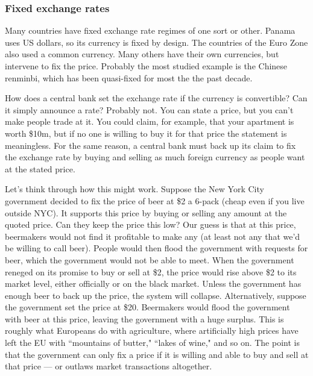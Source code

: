 \documentclass[letterpaper,12pt]{article}
\begin{document}
\subsubsection*{Fixed exchange rates}

Many countries have fixed exchange rate regimes of one sort or other.
Panama uses US dollars, so its currency is fixed by design.
The countries of the Euro Zone also used a common currency.
Many others have their own currencies, but intervene to
fix the price.
Probably the most studied example is the Chinese renminbi,
which has been quasi-fixed for most the the past decade.


How does a central bank set the exchange rate if the currency
 is convertible?
Can it simply announce a rate?
Probably not.
You can state a price, but you can't make people trade at it.
You could claim, for example, that your apartment is worth
\$10m, but if no one is willing to buy it for that price
the statement is meaningless.
For the same reason, a central bank must back up its
claim to fix the exchange rate by buying and selling as much
foreign currency as people want at the stated price.


Let's think through how this might work.
Suppose the New York City government decided to fix the price of beer at \$2 a 6-pack (cheap even if you live outside NYC).
It supports this price by buying or selling
any amount at the quoted price.  Can they keep the price this low?
Our guess is that at this price,
beermakers would not find it profitable to make any
(at least not any that we'd be willing to call beer).  People would then flood the government with requests for beer, which the government would
not be able to meet.  When the government reneged on its promise to buy or sell at \$2, the price
would rise above \$2 to its market level, either officially or on the black market.
Unless the government has enough beer to back up the price,
the system will collapse.
Alternatively, suppose the government set the price at \$20.
Beermakers would flood the government with beer at this price, leaving the
government with a huge surplus.  This is roughly what Europeans do with agriculture, where artificially high prices have left the EU with
``mountains of butter," ``lakes of wine," and so on.
The point is that the government can only fix a price
if it is willing and able to buy and sell at that price
--- or outlaws market transactions altogether.
\end{document}

